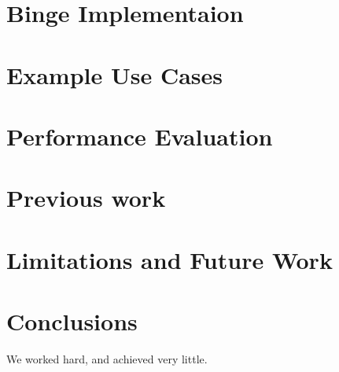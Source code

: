 \documentclass[10pt,twocolumn]{article}
\begin{document}
\section{Binge Implementaion}\label{binge:implementation}
\section{Example Use Cases}\label{usecases}
\section{Performance Evaluation}\label{evaluation}
\section{Previous work}\label{previous:work}
\section{Limitations and Future Work}\label{future:work}
\section{Conclusions}\label{conclusions}
We worked hard, and achieved very little.



\end{document}
